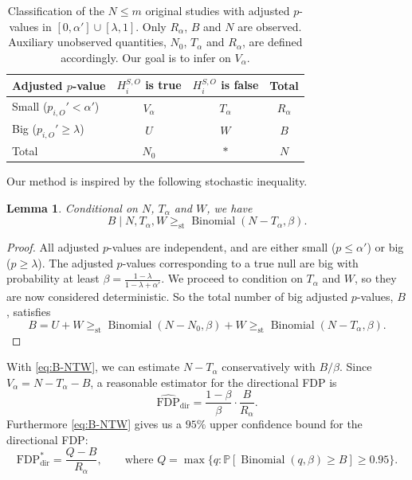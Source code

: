 \documentclass[aoas, preprint]{imsart}
\newtheorem{lemma}[corollary]{Lemma}
\theoremstyle{definition}
\theoremstyle{custom}
\newcommand{\PP}{\mathbb{P}}
\DeclareMathOperator{\Binomial}{Binomial}
\newcommand{\FDPd}{\text{FDP}_\text{dir}}
\newcommand{\hFDPd}{\widehat{\text{FDP}}_\text{dir}}
\newcommand{\gest}{\ge_\text{st}}
\begin{document}
  \begin{table}[htbp]
    \centering
    \begin{tabular}{lccc}
      \toprule
      Adjusted $p$-value & $H_i^{S,O}$ is true & $H_i^{S,O}$ is false & Total \\
      \midrule
      Small ($p_{i,O}' < \alpha'$) & $V_\alpha$ & $T_\alpha$ & $R_\alpha$ \\
      Big ($p_{i,O}' \ge \lambda$) & $U$ & $W$ & $B$ \\
      Total & $N_0$ & $*$ & $N$ \\
      \bottomrule
    \end{tabular}
    \caption{Classification of the $N \le m$ original studies with adjusted $p$-values in $[0, \alpha'] \cup [\lambda, 1]$. Only $R_\alpha$, $B$ and $N$ are observed. Auxiliary unobserved quantities, $N_0$, $T_\alpha$ and $R_\alpha$, are defined accordingly. Our goal is to infer on $V_\alpha$.}
    \label{tbl:big-small}
  \end{table}
  
  Our method is inspired by the following stochastic inequality.
  \begin{lemma}
    Conditional on $N$, $T_\alpha$ and $W$, we have
    \begin{equation}
      B \mid N, T_\alpha, W \gest \Binomial(N - T_\alpha, \beta).
    \label{eq:B-NTW}
    \end{equation}
  \end{lemma}
  \begin{proof}
    All adjusted $p$-values are independent, and are either small ($p \le \alpha'$) or big ($p \ge \lambda$). The adjusted $p$-values corresponding to a true null are big with probability at least $\beta = \frac{1 - \lambda}{1 - \lambda + \alpha'}$. We proceed to condition on $T_\alpha$ and $W$, so they are now considered deterministic. So the total number of big adjusted $p$-values, $B$, satisfies
    \[
      B = U + W \gest \Binomial(N-N_0, \beta) + W \gest \Binomial(N-T_\alpha, \beta).
    \]
  \end{proof}

  With \eqref{eq:B-NTW}, we can estimate $N - T_\alpha$ conservatively with $B / \beta$. Since $V_\alpha  = N - T_\alpha - B$, a reasonable estimator for the directional FDP is
  \[
    \hFDPd = \frac{1 - \beta}{\beta} \cdot \frac{B}{R_\alpha}.
  \]
  Furthermore \eqref{eq:B-NTW} gives us a $95\%$ upper confidence bound for the directional FDP:
  \[
    \FDPd^* = \frac{Q - B}{R_\alpha}, \qquad\text{where } Q = \max\{q: \PP[\Binomial(q, \beta) \ge B] \ge 0.95\}.
  \]
\end{document}
